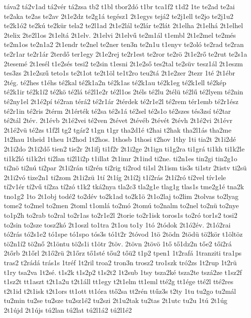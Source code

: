 {táva2
tá2v1ad
tá2vér
tá2zsa
tb2
t1bl
tbor2dó
t1br
tca1f2
t1d2
1te
te2ad
te2ai
te2aka
te2as
te2av
2t1e2dz
te2g1á
tegész1
2t1egys
tejá2
te2j1ell
te2jo
te2j1u2
te2k1ó2
te2kú
te2kür
tela2
te2l1ad
2t1e2lál
te2lár
te2lát
2t1elha
2t1elhá
2t1elhel
2telix
2te2l1os
2t1eltá
2t1elv.
2t1elvi
2t1elvű
te2m1ál
t1embl
2t1e2mel
te2més
te2m1os
te2n1a2
2t1endr
te2nel
te2ner
ten3n
te2n1u
t1enyv
te2oló
te2rad
te2ran
te2r1ar
te2r1ár
2terdő
ter1egy
2t1e2rej
te2r1est
te2ror
te2rö
2t1e2rő
te2rut
te2s1a
2tesemé
2t1esél
t1e2sés
tesi2
te2sin
t1esni
2t1e2ső
tes2tal
te2süv
tesz1ál
2t1eszm
tes3zs
2t1e2szű
teto1s
te2t1ot
te2t1öl
te1t2ro
teu2tá
2t1e2zer
2tezr
1té
2t1ébr
2tég.
té2hes
t1éhs
té2kal
té2k1a2n
té2k1as
té2k1au
té2k1eg
té2k1ell
té2kép
té2k1ir
té2k1í2
té2kö
té2lá
té2l1e2r
té2l1os
2téls
té2lu
2télü
té2lű
té2lyem
té2nin
té2ny1el
2t1é2pí
té2ran
térá2
té2r1ár
2térdek
té2r1e2l
té2rem
tér1emb
té2r1ész
té2r1in
té2ris
2térm
2t1érték
té2sa
té2s1á
té2sel
té2s1o
té2szes
tés3zsí
té2tar
té2tál
2tév.
2t1évb
2t1é2vei
té2ven
2tévet
2tévéb
2tévét
2tévh
2t1é2vi
2t1évr
2t1é2vü
té2zs
t1f2l
tg2
tgár2
t1gn
t1gr
tha2d1é
t2hai
t2hak
tha2l1ás
tha2me
1t2hau
1theid
1theu
1t2hod
1t2hos.
1thosb
1thosi
t2hov
1thy
1ti
tia2t
2t1i2dé
2t1i2do
2t1i2dő
tien2
tie2r
2t1ifj
ti1f2r
2t1i2ge
2t1ign
ti1g2ra
ti1grá
ti1kh
ti1k2le
ti1k2ló
ti1k2ri
ti2lan
ti2l1i2p
t1illat
2t1imr
2t1ind
ti2ne.
ti2n1es
tin2gi
tin2g1o
ti2nö
ti2nú
ti2par
2t1i2rán
ti2rén
ti2rig
ti2rod
ti1sl
2t1ism
tis3s
ti1str
2tistv
ti2sü
2t1i2vó
tize2n1
ti2zom
2t1i2zü
1tí
2t1íg
2t1í2j
t1í2rás
2t1í2ró
tí2vel
tív1ele
tí2v1ér
tí2vű
tí2za
tí2zó
t1k2
tká2nya
tla2c3
tla2g1e
tlag1g
tlas1s
tme2g1é
tna2k
tno1g2
1to
2t1obj
todé2
to2dév
to2k1ad
to2k1ö
2t1o2laj
to2lim
2tolvas
to2lyag
tome2
to2mel
to2men
2toml
t1omlá
to2mó
2tomú
to2nalm
to2nel
to2nü
to2nye
to1p2h
to2rab
to2ral
to2r1as
to2r1e2l
2torie
to2r1isk
toros1s
to2ró
tor1s2
tosi2
to2sin
to2sze
tosz2kó
2t1oszl
to1tra
2t1ou
to1y
1tó
2tódok
2t1ó2év.
2t1ó2rai
tó2rás
tó2s1e2
tó1spe
tó1spo
tós3s
tó1t2r
2tóvod
1tö
2tödn
2tödü
tö2kör
t1öltöz
tö2n1í2
tö2nő
2t1öntu
tö2s1i
t1ötr
2töv.
2tövn
2tövö
1tő
tő1dz2n
tőe2
tői2rá
2tőrb
2t1őrl
2t1ő2rü
2t1őrz
tő1sté
tőu2
tőü2
t1p2
tpen1
1t2rafá
1tranziti
tra1ps
tras2
t2rádá
trás1s
1tréf
1t2ril
troa2
tron3n
trosz2
tro1szk
tró2zs
1t2rup
1t2rü
t1ry
tsa2va
1t2sé.
t1s2k
t1s2p2
t1s2t2
1t2sub
1tsy
tsza2ké
tsza2te
tszá2ze
t1sz2f
t1sz2t
tt1aszt
t2t1a2u
t2t1áll
tt1egy
t2t1elm
tt1eml
tté2g
tt1ége
tté2l
tté2res
t2t1id
t2t1isk
t2t1ors
tt1ott
tt1óra
ttő2sa
tt2rén
ttűz3s
t2ty
1tu
tu2go
tu2mál
tu2min
tu2se
tu2sze
tu2sz1é2
tu2szi
2t1u2tak
tu2tas
2t1utc
tu2u
1tú
2t1úg
2t1újd
2t1újs
tú2lan
tú2lat
tú2l1á2
tú2l1é2
}

